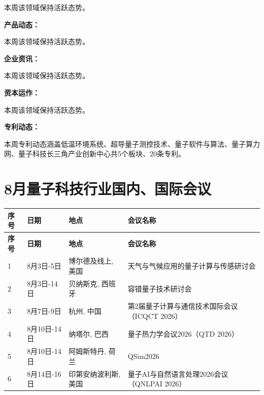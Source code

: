 \documentclass[12pt,a4paper]{ctexart}
\begin{document}
本周该领域保持活跃态势。


\textbf{ 产品动态：}

本周该领域保持活跃态势。


\textbf{ 企业资讯：}

本周该领域保持活跃态势。


\textbf{ 资本运作：}

本周该领域保持活跃态势。




\textbf{ 专利动态：}

本周专利动态涵盖低温环境系统、超导量子测控技术、量子软件与算法、量子算力网、量子科技长三角产业创新中心共5个板块、20条专利。




{
    \newpage
    \section*{ 8月量子科技行业国内、国际会议}
    \scriptsize
    \begin{longtable}{C{0.8cm}L{2.5cm}L{3cm}L{7cm}}
        \toprule[1.5pt]
        \textbf{序号} & \textbf{日期} & \textbf{地点} & \textbf{会议名称} \\
        \midrule
        \endfirsthead
        \toprule
        \textbf{序号} & \textbf{日期} & \textbf{地点} & \textbf{会议名称} \\
        \midrule
        \endhead
        \bottomrule
        \endfoot
        
        1 & 8月3日-5日 & 博尔德及线上, 美国 & 天气与气候应用的量子计算与传感研讨会 \\
        \midrule[0.05pt]
        
        2 & 8月3日-14日 & 贝纳斯克, 西班牙 & 容错量子技术研讨会 \\
        \midrule[0.05pt]
        
        3 & 8月7日-9日 & 杭州, 中国 & 第2届量子计算与通信技术国际会议（ICQCT 2026） \\
        \midrule[0.05pt]
        
        4 & 8月10日-14日 & 纳塔尔, 巴西 & 量子热力学会议2026（QTD 2026） \\
        \midrule[0.05pt]
        
        5 & 8月10日-14日 & 阿姆斯特丹, 荷兰 & QSim2026 \\
        \midrule[0.05pt]
        
        6 & 8月14日-16日 & 印第安纳波利斯, 美国 & 量子AI与自然语言处理2026会议（QNLPAI 2026） \\
        \midrule[0.05pt]
        

\end{longtable}}
\end{document}
